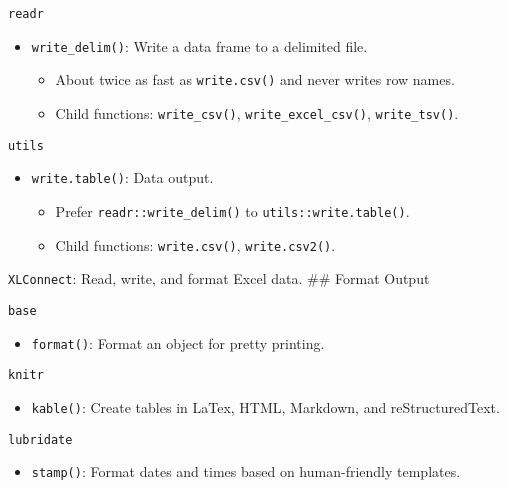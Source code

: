\documentclass[]{book}
\providecommand{\tightlist}{%
  \setlength{\itemsep}{0pt}\setlength{\parskip}{0pt}}
\begin{document}
\texttt{readr}

\begin{itemize}
\tightlist
\item
  \texttt{write\_delim()}: Write a data frame to a delimited file.

  \begin{itemize}
  \tightlist
  \item
    About twice as fast as \texttt{write.csv()} and never writes row names.
  \item
    Child functions: \texttt{write\_csv()}, \texttt{write\_excel\_csv()}, \texttt{write\_tsv()}.
  \end{itemize}
\end{itemize}

\texttt{utils}

\begin{itemize}
\tightlist
\item
  \texttt{write.table()}: Data output.

  \begin{itemize}
  \tightlist
  \item
    Prefer \texttt{readr::write\_delim()} to \texttt{utils::write.table()}.
  \item
    Child functions: \texttt{write.csv()}, \texttt{write.csv2()}.
  \end{itemize}
\end{itemize}

\texttt{XLConnect}: Read, write, and format Excel data.
\#\# Format Output

\texttt{base}

\begin{itemize}
\tightlist
\item
  \texttt{format()}: Format an object for pretty printing.
\end{itemize}

\texttt{knitr}

\begin{itemize}
\tightlist
\item
  \texttt{kable()}: Create tables in LaTex, HTML, Markdown, and reStructuredText.
\end{itemize}

\texttt{lubridate}

\begin{itemize}
\tightlist
\item
  \texttt{stamp()}: Format dates and times based on human-friendly templates.
\end{itemize}
\end{document}

